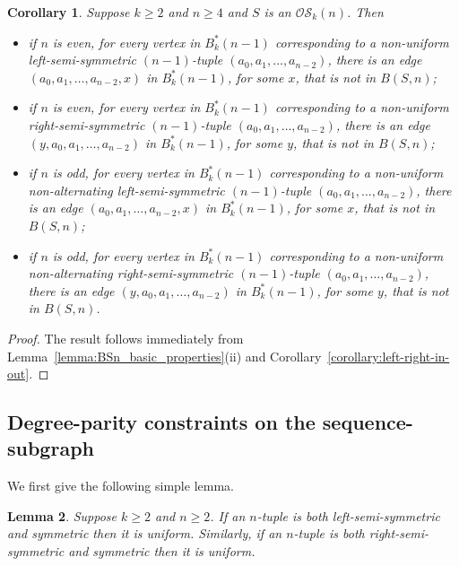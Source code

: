 \documentclass[a4paper,11pt]{article}
\newtheorem{lemma}{Lemma}[section]
\newtheorem{corollary}[lemma]{Corollary}
\begin{document}
\begin{corollary}  \label{corollary:excluded_tuples_by_unequal_degree}
Suppose $k\geq2$ and $n\geq4$ and $S$ is an $\mathcal{OS}_k(n)$. Then
\begin{itemize}
\item[i)] if $n$ is even, for every vertex in $B^*_k(n-1)$ corresponding to a non-uniform
    left-semi-symmetric $(n-1)$-tuple $(a_0,a_1,\ldots,a_{n-2})$, there is an edge
    $(a_0,a_1,\ldots,a_{n-2},x)$ in $B^*_k(n-1)$, for some $x$, that is not in $B(S,n)$;
\item[ii)] if $n$ is even, for every vertex in $B^*_k(n-1)$ corresponding to a non-uniform
    right-semi-symmetric $(n-1)$-tuple $(a_0,a_1,\ldots,a_{n-2})$, there is an edge
    $(y,a_0,a_1,\ldots,a_{n-2})$ in $B^*_k(n-1)$, for some $y$, that is not in $B(S,n)$;
\item[iii)] if $n$ is odd, for every vertex in $B^*_k(n-1)$ corresponding to a non-uniform
    non-alternating left-semi-symmetric $(n-1)$-tuple $(a_0,a_1,\ldots,a_{n-2})$, there is an
    edge $(a_0,a_1,\ldots,a_{n-2},x)$ in $B^*_k(n-1)$, for some $x$, that is not in $B(S,n)$;
\item[iv)] if $n$ is odd, for every vertex in $B^*_k(n-1)$ corresponding to a non-uniform
    non-alternating right-semi-symmetric $(n-1)$-tuple $(a_0,a_1,\ldots,a_{n-2})$, there is an
    edge $(y,a_0,a_1,\ldots,a_{n-2})$ in $B^*_k(n-1)$, for some $y$, that is not in $B(S,n)$.
\end{itemize}
\end{corollary}

\begin{proof}
The result follows immediately from Lemma~\ref{lemma:BSn_basic_properties}(ii) and
Corollary~\ref{corollary:left-right-in-out}.
\end{proof}


\subsection{Degree-parity constraints on the sequence-subgraph}  \label{subsection:parity-constraints}

We first give the following simple lemma.

\begin{lemma}  \label{lemma:semi-symmetric_not_symmetric}
Suppose $k\geq2$ and $n\geq2$.  If an $n$-tuple is both left-semi-symmetric and symmetric then it
is uniform.  Similarly, if an $n$-tuple is both right-semi-symmetric and symmetric then it is
uniform.
\end{lemma}
\end{document}
